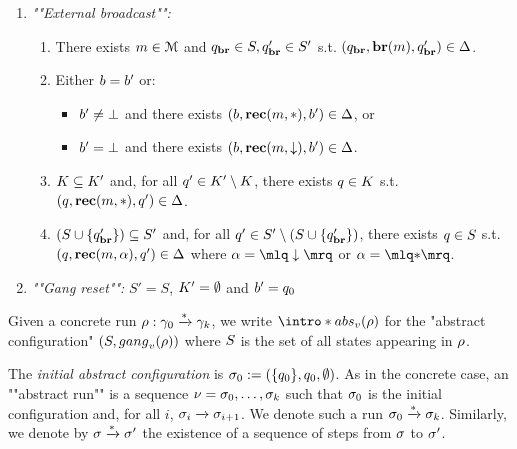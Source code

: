 \begin{definition}
\begin{enumerate}
		
		\item \emph{""External broadcast"":}
		\begin{enumerate}[label = (\arabic*)]
			\item\label{item:external_broadcast_broadcast} There exists $m \in \mathcal{M}$ and $q_{\textbf{br}} \in S, q_{\textbf{br}}' \in S'$ s.t. $(q_{\textbf{br}}, \textbf{br}(m), q_{\textbf{br}}') \in \Delta$. 
			
			\item\label{item:external_broadcast_boss}Either $\boss = \boss'$ or:
			\begin{itemize} 
				\item $\boss' \ne \noboss$ and there exists $(\boss, \recone{\amessage}{\dummyact}, \boss') \in \transitions$, or
				\item $\boss' = \noboss$ and there exists $(\boss, \recone{\amessage}{\enregact}, \boss') \in \transitions$.
			\end{itemize}
			
			\item\label{item:external_broadcast_clique}$\clique \subseteq \clique'$ and, for all $q' \in \clique' \setminus \clique$, there exists $q \in \clique$ s.t. $(q, \textbf{rec}(m, {*}), q') \in \Delta$.
			
			\item\label{item:external_broadcast_covset}$(S \cup \{q_{\textbf{br}}'\}) \subseteq S'$ and, for all $q' \in S' \setminus (S \cup \{q_{\textbf{br}}'\})$, there exists $q \in S$ s.t. $(q, \textbf{rec}(m, \alpha), q') \in \Delta$ where $\anact = \quotemarks{\enregact}$ or $\anact = \quotemarks{\dummyact}$.
		\end{enumerate}
		\item \emph{""Gang reset"":} $S' = S$, $\clique' = \emptyset$ and $\boss'= q_0$
	\end{enumerate}
	
	
	Given a concrete run $\rho: \gamma_0 \xrightarrow{*} \gamma_k$, we write \AP  $\intro*\absproj{\aval}{\run}$ for the "abstract configuration" $(\covset, \gangof{\aval}{\run})$ where $S$ is the set of all states appearing in $\rho$. 
	
	The \emph{initial abstract configuration} is $\sigma_0 := (\{q_0\}, q_0, \emptyset)$. 
	As in the concrete case, an ""abstract run"" is a sequence $\nu = \sigma_0, \dots, \sigma_k$ such that $\sigma_0$ is the initial configuration and, for all $i$, $\sigma_i \xrightarrow{} \sigma_{i+1}$. We denote such a run $\sigma_0 \xrightarrow{*} \sigma_k$. Similarly, we denote by $\sigma \xrightarrow{*} \sigma'$ the existence of a sequence of steps from $\sigma$ to $\sigma'$.
\end{definition}

